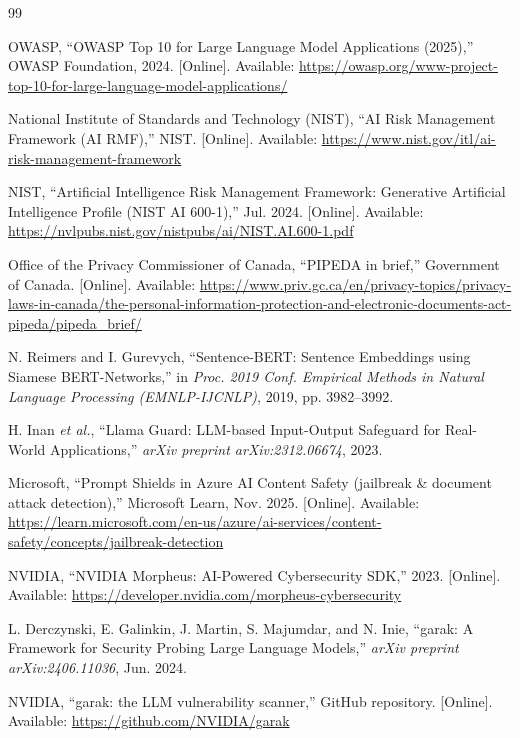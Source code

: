 \documentclass[12pt,a4paper]{article}
\begin{document}
\begin{thebibliography}{99}

OWASP, ``OWASP Top 10 for Large Language Model Applications (2025),'' OWASP Foundation, 2024. [Online]. Available: \url{https://owasp.org/www-project-top-10-for-large-language-model-applications/}

National Institute of Standards and Technology (NIST), ``AI Risk Management Framework (AI RMF),'' NIST. [Online]. Available: \url{https://www.nist.gov/itl/ai-risk-management-framework}

NIST, ``Artificial Intelligence Risk Management Framework: Generative Artificial Intelligence Profile (NIST AI 600-1),'' Jul. 2024. [Online]. Available: \url{https://nvlpubs.nist.gov/nistpubs/ai/NIST.AI.600-1.pdf}

Office of the Privacy Commissioner of Canada, ``PIPEDA in brief,'' Government of Canada. [Online]. Available: \url{https://www.priv.gc.ca/en/privacy-topics/privacy-laws-in-canada/the-personal-information-protection-and-electronic-documents-act-pipeda/pipeda_brief/}

N. Reimers and I. Gurevych, ``Sentence-BERT: Sentence Embeddings using Siamese BERT-Networks,'' in \textit{Proc. 2019 Conf. Empirical Methods in Natural Language Processing (EMNLP-IJCNLP)}, 2019, pp. 3982--3992.

H. Inan \textit{et al.}, ``Llama Guard: LLM-based Input-Output Safeguard for Real-World Applications,'' \textit{arXiv preprint arXiv:2312.06674}, 2023.

Microsoft, ``Prompt Shields in Azure AI Content Safety (jailbreak \& document attack detection),'' Microsoft Learn, Nov. 2025. [Online]. Available: \url{https://learn.microsoft.com/en-us/azure/ai-services/content-safety/concepts/jailbreak-detection}

NVIDIA, ``NVIDIA Morpheus: AI-Powered Cybersecurity SDK,'' 2023. [Online]. Available: \url{https://developer.nvidia.com/morpheus-cybersecurity}

L. Derczynski, E. Galinkin, J. Martin, S. Majumdar, and N. Inie, ``garak: A Framework for Security Probing Large Language Models,'' \textit{arXiv preprint arXiv:2406.11036}, Jun. 2024.

NVIDIA, ``garak: the LLM vulnerability scanner,'' GitHub repository. [Online]. Available: \url{https://github.com/NVIDIA/garak}


\end{thebibliography}
\end{document}
